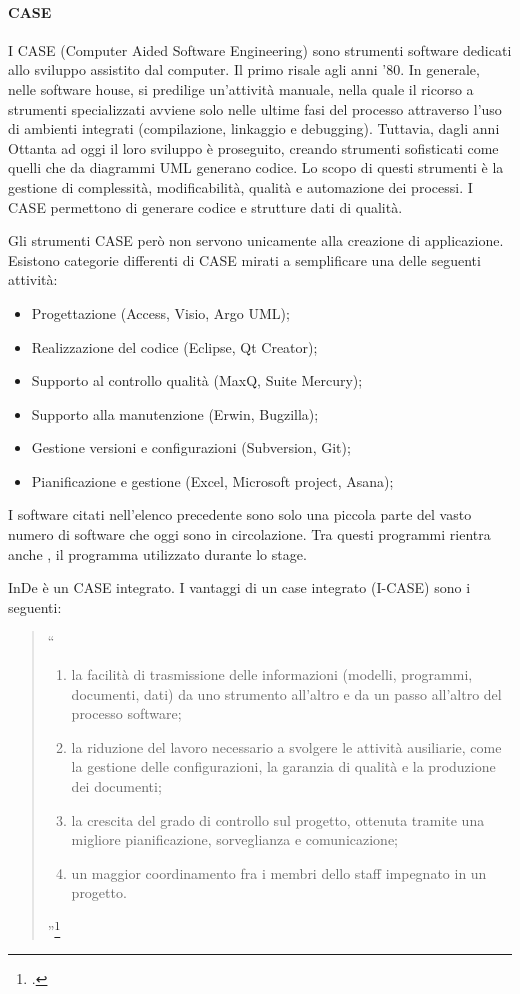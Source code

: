 \paragraph{CASE}\label{CASE}
I CASE (Computer Aided Software Engineering) sono strumenti software dedicati allo sviluppo assistito dal computer. Il primo risale agli anni '80. In generale, nelle software house, si predilige un'attività manuale, nella quale il ricorso a strumenti specializzati avviene solo nelle ultime fasi del processo attraverso l'uso di ambienti integrati (compilazione, linkaggio e debugging).
Tuttavia, dagli anni Ottanta ad oggi il loro sviluppo è proseguito, creando strumenti sofisticati come quelli che da diagrammi UML generano codice.
Lo scopo di questi strumenti è la gestione di complessità, modificabilità, qualità e automazione dei processi. I CASE permettono di generare codice e strutture dati di qualità. 

Gli strumenti CASE però non servono unicamente alla creazione di applicazione. Esistono categorie differenti di CASE mirati a semplificare una delle seguenti attività:
\begin{itemize}
	\item Progettazione (Access, Visio, Argo UML);
	\item Realizzazione del codice (Eclipse, Qt Creator);
	\item Supporto al controllo qualità (MaxQ, Suite Mercury);
	\item Supporto alla manutenzione (Erwin, Bugzilla);
	\item Gestione versioni e configurazioni (Subversion, Git);
	\item Pianificazione e gestione (Excel, Microsoft project, Asana);
\end{itemize}
I software citati nell'elenco precedente sono solo una piccola parte del vasto numero di software che oggi sono in circolazione. Tra questi programmi rientra anche \inde, il programma utilizzato durante lo stage. 

InDe è un CASE integrato. I vantaggi di un case integrato (I-CASE) sono i seguenti:

\begin{quote}
	``	
	\begin{enumerate}
		\item la facilità di trasmissione delle informazioni (modelli, programmi, documenti, dati) da uno strumento all'altro e da un passo all'altro del processo software; 
		\item la riduzione del lavoro necessario a svolgere le attività ausiliarie, come la gestione delle configurazioni, la garanzia di qualità e la produzione dei documenti; 
		\item la crescita del grado di controllo sul pro­getto, ottenuta tramite una migliore pianificazione, sorveglianza e comunicazione; 
		\item un maggior coordinamento fra i membri dello staff impegnato in un progetto.
	\end{enumerate}
		''\footcite{[12]}
\end{quote}


